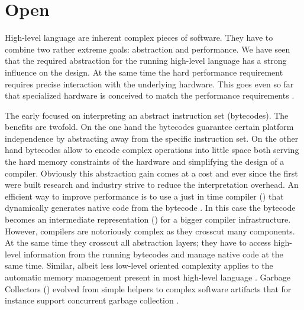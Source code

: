\section{Open \VMs}

High-level language \VMs are inherent complex pieces of software.
They have to combine two rather extreme goals: abstraction and performance.
We have seen that the required abstraction for the running high-level language has a strong influence on the \VM design.
At the same time the hard performance requirement requires precise interaction with the underlying hardware.
This goes even so far that specialized hardware is conceived to match the performance requirements \cite{Clic05a}.

The early \VMs focused on interpreting an abstract instruction set (bytecodes).
The benefits are twofold.
On the one hand the bytecodes guarantee certain platform independence by abstracting away from the \CPU specific instruction set.
On the other hand bytecodes allow to encode complex operations into little space both serving the hard memory constraints of the hardware and simplifying the design of a compiler.
Obviously this abstraction gain comes at a cost and ever since the first \VMs were built research and industry strive to reduce the interpretation overhead.
An efficient way to improve performance is to use a just in time compiler (\JIT) that dynamically generates native code from the bytecode \cite{??}.
In this case the bytecode becomes an intermediate representation (\IR) for a bigger compiler infrastructure.
However, \JIT compilers are notoriously complex as they crosscut many \VM components.
At the same time they crosscut all abstraction layers; they have to access high-level information from the running bytecodes and manage native code at the same time.
Similar, albeit less low-level oriented complexity applies to the automatic memory management present in most high-level language \VMs.
Garbage Collectors (\GC) evolved from simple helpers to complex software artifacts that for instance support concurrent garbage collection \cite{Clic05a}.

